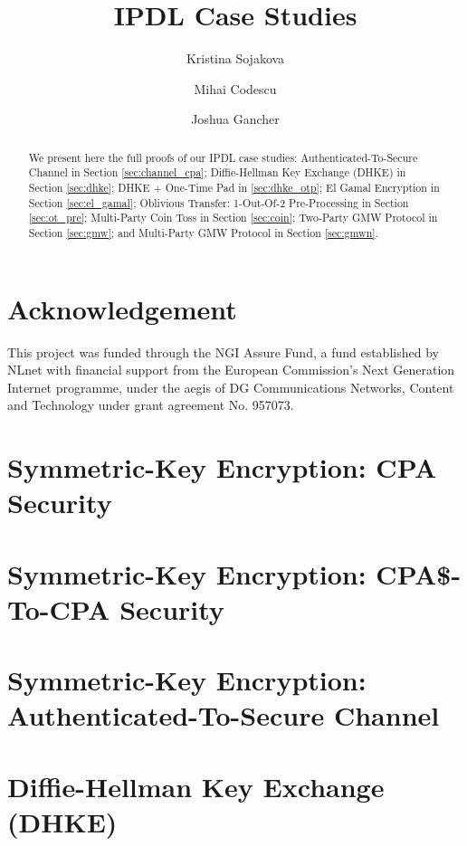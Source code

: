 \documentclass[11pt,hidelinks]{article}
\newcommand{\ipdl}{\textsf{IPDL} }
\begin{document}
\title{\ipdl Case Studies}
\author{Kristina Sojakova \and Mihai Codescu \and Joshua Gancher}

\maketitle

\begin{abstract}
We present here the full proofs of our \ipdl case studies: Authenticated-To-Secure Channel in Section \ref{sec:channel_cpa};
Diffie-Hellman Key Exchange (DHKE) in Section \ref{sec:dhke}; DHKE + One-Time Pad in \ref{sec:dhke_otp}; El Gamal Encryption in Section \ref{sec:el_gamal}; Oblivious Transfer: 1-Out-Of-2 Pre-Processing in Section \ref{sec:ot_pre}; Multi-Party Coin Toss in Section \ref{sec:coin}; Two-Party GMW Protocol in Section \ref{sec:gmw}; and Multi-Party GMW Protocol in Section \ref{sec:gmwn}.
\end{abstract}

\section*{\small Acknowledgement}
This project was funded through the NGI Assure Fund, a fund established by NLnet with financial support from the European Commission's Next Generation Internet programme, under the aegis of DG Communications Networks, Content and Technology under grant agreement No. 957073.

\section{Symmetric-Key Encryption: CPA Security}\label{sec:cpa}


\section{Symmetric-Key Encryption: CPA\$-To-CPA Security}\label{sec:pseudo_cpa}


\section{Symmetric-Key Encryption: Authenticated-To-Secure Channel}\label{sec:channel_cpa}


\section{Diffie-Hellman Key Exchange (DHKE)}\label{sec:dhke}

\end{document}
